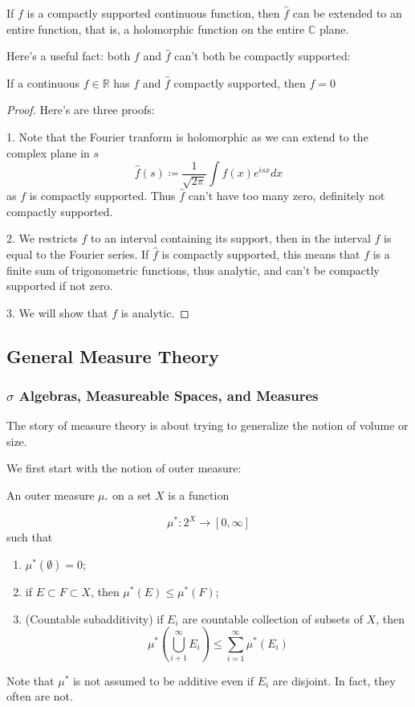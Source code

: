 \documentclass[main.tex]{subfiles}
\begin{document}
If $f$ is a compactly supported continuous function, then $\hat{f}$ can be extended to an entire function, that is, a holomorphic function on the entire $\mathbb{C}$ plane.

Here's a useful fact: both $f$ and $\hat{f}$ can't both be compactly supported:

\begin{theorem}
If a continuous $f \in \mathbb{R}$ has $f$ and $\hat{f}$ compactly supported, then $f = 0$
\end{theorem}

\begin{proof}
Here's are three proofs:

1. Note that the Fourier tranform is holomorphic as we can extend to the complex plane in $s$
$$
\hat{f}(s) \coloneqq \frac{1}{\sqrt{2\pi}} \int f(x) e^{isx} dx
$$
as $f$ is compactly supported. Thus $\hat{f}$ can't have too many zero, definitely not compactly supported.

2. We restricts $f$ to an interval containing its support, then in the interval $f$ is equal to the Fourier series. If $\hat{f}$ is compactly supported, this means that $f$ is a finite sum of trigonometric functions, thus analytic, and can't be compactly supported if not zero.

3. We will show that $f$ is analytic. 
\end{proof}



\subsection{General Measure Theory}

\subsubsection{$\sigma$ Algebras, Measureable Spaces, and Measures}
The story of measure theory is about trying to generalize the notion of volume or size. 

We first start with the notion of outer measure:

\begin{definition}
An outer measure $\mu_^*$ on a set $X$ is a function 

$$
\mu^* : 2^X \rightarrow [0, \infty]
$$ 
such that 
\begin{enumerate}
    \item $\mu^*(\emptyset) = 0$;
    \item if $E \subset F \subset X$, then $\mu^*(E) \leq \mu^*(F)$;
    \item (Countable subadditivity) if $E_i$ are countable collection of subsets of $X$, then 
    $$
    \mu^*(\bigcup_{i + 1} ^{\infty} E_i)\leq \sum_{i = 1} ^{\infty} \mu^*(E_i)
    $$
\end{enumerate}
\end{definition}
Note that $\mu^*$ is not assumed to be additive even if ${E_i}$ are disjoint. In fact, they often are not.
\end{document}
